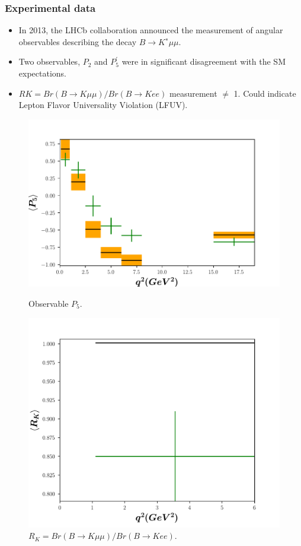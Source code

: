 \documentclass{beamer}
\begin{document}
\begin{frame}
\frametitle{Experimental data }
\begin{itemize}
	\item In 2013,
	the LHCb collaboration announced the measurement of angular observables describing
	the decay \(B \rightarrow K^∗\mu\mu \).
	\item Two observables, \(P_2 \) and \(P^{\prime}_5\) were in significant disagreement with the SM expectations.
	\item \(RK = Br(B \rightarrow K\mu\mu)/Br(B \rightarrow Kee) \) measurement $\neq$ 1. Could indicate Lepton Flavor Universality Violation (LFUV).
\end{itemize}
\begin{figure}
	\centering
	\begin{minipage}{.5\textwidth}
		\centering
		\includegraphics[width=.8\linewidth]{imagenes/P5.pdf}
		\caption{Observable \(P_5\).}
		\label{fig:P5}
	\end{minipage}%
	\begin{minipage}{.5\textwidth}
		\centering
		\includegraphics[width=.8\linewidth]{imagenes/RK.pdf}
		\caption{\(R_K = Br(B\rightarrow K\mu\mu)/ Br(B\rightarrow Kee)\).}
		\label{fig:RK}
	\end{minipage}
\end{figure}



\end{frame}
\end{document}
